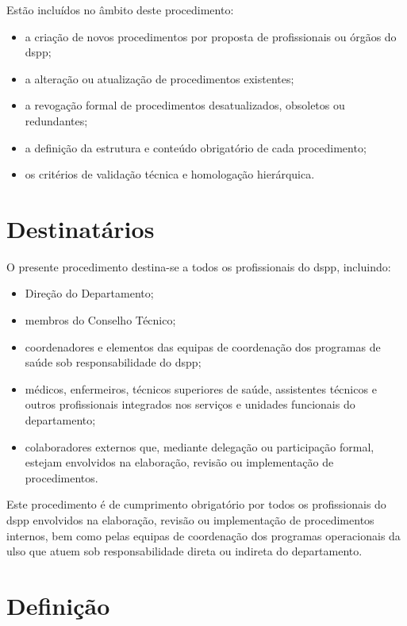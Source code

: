Estão incluídos no âmbito deste procedimento:

\begin{itemize}
    \item a criação de novos procedimentos por proposta de profissionais ou órgãos do \gls{dspp};
    \item a alteração ou atualização de procedimentos existentes;
    \item a revogação formal de procedimentos desatualizados, obsoletos ou redundantes;
    \item a definição da estrutura e conteúdo obrigatório de cada procedimento;
    \item os critérios de validação técnica e homologação hierárquica.
\end{itemize}


\section{Destinatários}\label{sec:destinatarios}

O presente procedimento destina-se a todos os profissionais do \gls{dspp}, incluindo:

\begin{itemize}
    \item Direção do Departamento;
    \item membros do Conselho Técnico;
    \item coordenadores e elementos das equipas de coordenação dos programas de saúde sob responsabilidade do \gls{dspp};
    \item médicos, enfermeiros, técnicos superiores de saúde, assistentes técnicos e outros profissionais integrados nos serviços e unidades funcionais do departamento;
    \item colaboradores externos que, mediante delegação ou participação formal, estejam envolvidos na elaboração, revisão ou implementação de procedimentos.
\end{itemize}

Este procedimento é de cumprimento obrigatório por todos os profissionais do \gls{dspp} envolvidos na elaboração, revisão ou implementação de procedimentos internos, bem como pelas equipas de coordenação dos programas operacionais da \gls{ulso} que atuem sob responsabilidade direta ou indireta do departamento.


\section{Definição}\label{sec:definicao}

